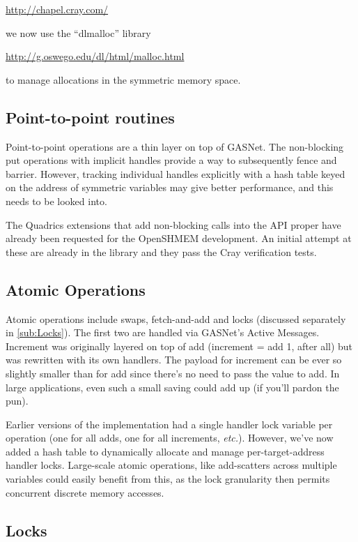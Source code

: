 \documentclass[english]{article}
\begin{document}
\url{http://chapel.cray.com/}

we now use the ``dlmalloc'' library

\url{http://g.oswego.edu/dl/html/malloc.html}

to manage allocations in the symmetric memory space.

\subsection{Point-to-point routines}

Point-to-point operations are a thin layer on top of GASNet. The
non-blocking put operations with implicit handles provide a way to
subsequently fence and barrier. However, tracking individual handles
explicitly with a hash table keyed on the address of symmetric
variables may give better performance, and this needs to be looked
into.

The Quadrics extensions that add non-blocking calls into the API
proper have already been requested for the OpenSHMEM development. An
initial attempt at these are already in the library and they pass the
Cray verification tests.

\subsection{Atomic Operations}

Atomic operations include swaps, fetch-and-add and locks (discussed
separately in \ref{sub:Locks}). The first two are handled via GASNet's
Active Messages. Increment was originally layered on top of add
(increment = add 1, after all) but was rewritten with its own
handlers. The payload for increment can be ever so slightly smaller
than for add since there's no need to pass the value to add. In large
applications, even such a small saving could add up (if you'll pardon
the pun).

Earlier versions of the implementation had a single handler lock
variable per operation (one for all adds, one for all increments,
\emph{etc.}).  However, we've now added a hash table to dynamically
allocate and manage per-target-address handler locks. Large-scale
atomic operations, like add-scatters across multiple variables could
easily benefit from this, as the lock granularity then permits
concurrent discrete memory accesses.

\subsection{\label{sub:Locks}Locks}
\end{document}
